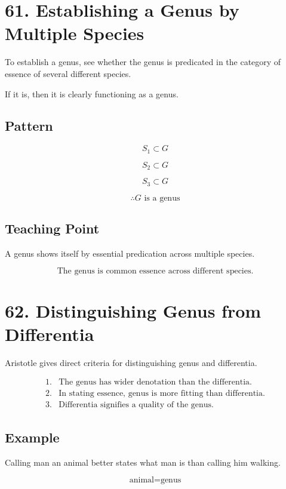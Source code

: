 \documentclass[12pt]{article}
\begin{document}
\section*{61. Establishing a Genus by Multiple Species}

To establish a genus, see whether the genus is predicated in the category of
essence of several different species.

If it is, then it is clearly functioning as a genus.

\subsection*{Pattern}

\[
S_1 \subset G
\]

\[
S_2 \subset G
\]

\[
S_3 \subset G
\]

\[
\therefore G \text{ is a genus}
\]

\subsection*{Teaching Point}

A genus shows itself by essential predication across multiple species.

\[
\boxed{
\text{The genus is common essence across different species.}
}
\]

\section*{62. Distinguishing Genus from Differentia}

Aristotle gives direct criteria for distinguishing genus and differentia.

\[
\begin{array}{ll}
1. & \text{The genus has wider denotation than the differentia.} \\
2. & \text{In stating essence, genus is more fitting than differentia.} \\
3. & \text{Differentia signifies a quality of the genus.}
\end{array}
\]

\subsection*{Example}

Calling man an animal better states what man is than calling him walking.

\[
\text{animal} = \text{genus}
\]
\end{document}
